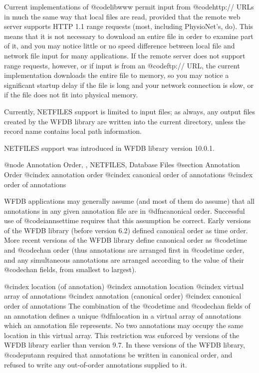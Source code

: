 {{{{{{{{{{Current implementations of @code{libwww} permit input from @code{http://} URLs
in much the same way that local files are read, provided that the remote web
server supports HTTP 1.1 range requests (most, including PhysioNet's, do).
This means that it is not necessary to download an entire file in order to
examine part of it, and you may notice little or no speed difference between
local file and network file input for many applications.  If the remote server
does not support range requests, however, or if input is from an @code{ftp://}
URL, the current implementation downloads the entire file to memory, so you may
notice a significant startup delay if the file is long and your network
connection is slow, or if the file does not fit into physical memory.

Currently, NETFILES support is limited to input files; as always, any output
files created by the WFDB library are written into the current directory,
unless the record name contains local path information.

NETFILES support was introduced in WFDB library version 10.0.1.

@node     Annotation Order, , NETFILES, Database Files
@section Annotation Order
@cindex annotation order
@cindex canonical order of annotations
@cindex order of annotations

WFDB applications may generally assume (and most of them do assume) that
all annotations in any given annotation file are in @dfn{canonical
order}.  Successful use of @code{iannsettime} requires that this assumption
be correct.  Early versions of the WFDB library (before version 6.2) defined
canonical order as time order.  More recent versions of the WFDB library define
canonical order as @code{time} and @code{chan} order (thus annotations
are arranged first in @code{time} order, and any simultaneous annotations are
arranged according to the value of their @code{chan} fields, from
smallest to largest).  

@cindex location (of annotation)
@cindex annotation location
@cindex virtual array of annotations
@cindex annotation (canonical order)
@cindex canonical order of annotations
The combination of the @code{time} and @code{chan} fields of an
annotation defines a unique @dfn{location} in a virtual array of
annotations which an annotation file represents.  No two annotations may
occupy the same location in this virtual array.  This restriction was
enforced by versions of the WFDB library earlier than version 9.7.  In
these versions of the WFDB library, @code{putann} required that
annotations be written in canonical order, and refused to write any
out-of-order annotations supplied to it.

}}}}}}}}}}
